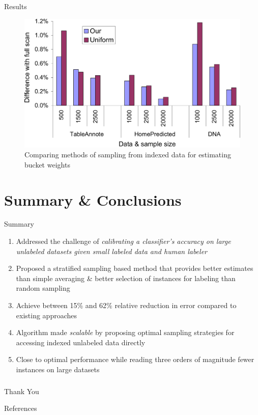 \documentclass[11pt]{beamer}
\newlength{\wideitemsep}
\let\olditem\item
\renewcommand{\item}{\setlength{\itemsep}{\wideitemsep}\olditem}
\begin{document}
\begin{frame}[allowframebreaks]{Results}
\begin{figure}
\begin{center}
\includegraphics[width=0.85\hsize]{figs/allDataWts-crop}
\caption{Comparing methods of sampling from indexed data for
  estimating bucket weights}
\label{fig:allWts}
\end{center}
\end{figure}

\end{frame}


\section{Summary \& Conclusions}
\begin{frame}{Summary}
\begin{enumerate}
\item Addressed the challenge of \emph{calibrating a classifier’s accuracy on large unlabeled datasets given small labeled data and human labeler}
\item Proposed a stratified sampling based method that provides better estimates than simple averaging \& better selection of instances for labeling than random sampling 
\item Achieve between 15\% and 62\% relative reduction in error compared to existing approaches
\item Algorithm made \emph{scalable} by proposing optimal sampling strategies for accessing indexed unlabeled data directly
\item Close to optimal performance while reading three orders of magnitude fewer instances on large datasets 
\end{enumerate}
\end{frame}

\begin{frame}
\frametitle{}
\begin{center}
\LARGE{Thank You}
\end{center}
\end{frame}


\begin{frame}[allowframebreaks]{References}

\end{frame}
\end{document}
